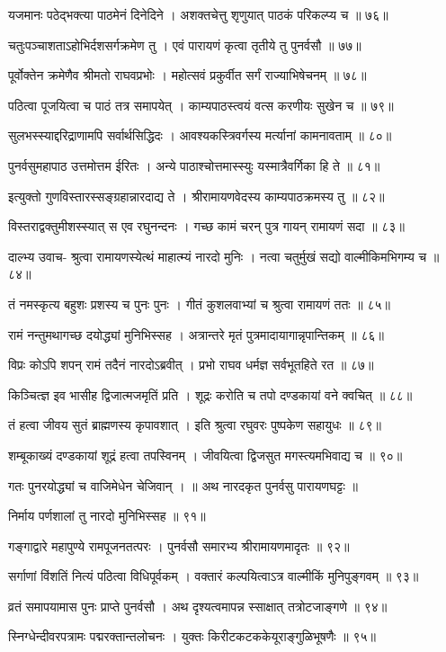 यजमानः पठेद्भक्त्या पाठमेनं दिनेदिने ।
अशक्तचेत्तु श‍ृणुयात् पाठकं परिकल्प्य च ॥ ७६॥

चतुःपञ्चाशताऽहोभिर्दशसर्गक्रमेण तु ।
एवं पारायणं कृत्वा तृतीये तु पुनर्वसौ ॥ ७७॥

पूर्वोक्तेन क्रमेणैव श्रीमतो राघवप्रभोः ।
महोत्सवं प्रकुर्वीत सर्गं राज्याभिषेचनम् ॥ ७८॥

पठित्वा पूजयित्वा च पाठं तत्र समापयेत् ।
काम्यपाठस्त्वयं वत्स करणीयः सुखेन च ॥ ७९॥

सुलभस्स्याद्दरिद्राणामपि सर्वार्थसिद्धिदः ।
आवश्यकस्त्रिवर्गस्य मर्त्यानां कामनावताम् ॥ ८०॥

पुनर्वसुमहापाठ उत्तमोत्तम ईरितः ।
अन्ये पाठाश्चोत्तमास्स्युः यस्मात्रैवर्गिका हि ते ॥ ८१॥

इत्युक्तो गुणविस्तारस्सङ्ग्रहान्नारदाद्य ते ।
श्रीरामायणवेदस्य काम्यपाठक्रमस्य तु ॥ ८२॥

विस्तराद्वक्तुमीशस्स्यात् स एव रघुनन्दनः ।
गच्छ कामं चरन् पुत्र गायन् रामायणं सदा ॥ ८३॥

दाल्भ्य उवाच-
श्रुत्वा रामायणस्येत्थं माहात्म्यं नारदो मुनिः ।
नत्वा चतुर्मुखं सद्यो वाल्मीकिमभिगम्य च ॥ ८४॥

तं नमस्कृत्य बहुशः प्रशस्य च पुनः पुनः ।
गीतं कुशलवाभ्यां च श्रुत्वा रामायणं ततः ॥ ८५॥

रामं नन्तुमथागच्छ दयोद्ध्यां मुनिभिस्सह ।
अत्रान्तरे मृतं पुत्रमादायागान्नृपान्तिकम् ॥ ८६॥

विप्रः कोऽपि शपन् रामं तदैनं नारदोऽब्रवीत् ।
प्रभो राघव धर्मज्ञ सर्वभूतहिते रत ॥ ८७॥

किञ्चित्ज्ञ इव भासीह द्विजात्मजमृतिं प्रति ।
शूद्रः करोति च तपो दण्डकायां वने क्वचित् ॥ ८८॥

तं हत्वा जीवय सुतं ब्राह्मणस्य कृपावशात् ।
इति श्रुत्वा रघुवरः पुष्पकेण सहायुधः ॥ ८९॥

शम्बूकाख्यं दण्डकायां शूद्रं हत्वा तपस्विनम् ।
जीवयित्वा द्विजसुत मगस्त्यमभिवाद्य च ॥ ९०॥

गतः पुनरयोद्ध्यां च वाजिमेधेन चेजिवान् ।
॥ अथ नारदकृत पुनर्वसु पारायणघट्टः ॥

निर्माय पर्णशालां तु नारदो मुनिभिस्सह ॥ ९१॥

गङ्गाद्वारे महापुण्ये रामपूजनतत्परः ।
पुनर्वसौ समारभ्य श्रीरामायणमादृतः ॥ ९२॥

सर्गाणां विंशतिं नित्यं पठित्वा विधिपूर्वकम् ।
वक्तारं कल्पयित्वाऽत्र वाल्मीकिं मुनिपुङ्गवम् ॥ ९३॥

व्रतं समापयामास पुनः प्राप्ते पुनर्वसौ ।
अथ दृश्यत्वमापन्न स्साक्षात् तत्रोटजाङ्गणे ॥ ९४॥

स्निग्धेन्दीवरपत्रामः पद्मरक्तान्तलोचनः ।
युक्तः किरीटकटककेयूराङ्गुळिभूषणैः ॥ ९५॥

